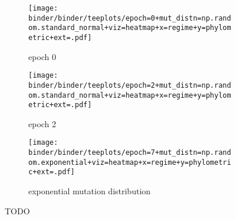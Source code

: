 \begin{figure*}
  \centering
  \begin{subfigure}[b]{\textwidth}
    \centering
    \texttt{[image: binder/binder/teeplots/epoch=0+mut\_distn=np.random.standard\_normal+viz=heatmap+x=regime+y=phylometric+ext=.pdf]}
    \caption{epoch 0}
    \label{fig:perfect-tree-phylometrics-heatmap-sensitivity-analysis:epoch0}
  \end{subfigure}
  \begin{subfigure}[b]{\textwidth}
    \centering
    \texttt{[image: binder/binder/teeplots/epoch=2+mut\_distn=np.random.standard\_normal+viz=heatmap+x=regime+y=phylometric+ext=.pdf]}
    \caption{epoch 2}
    \label{fig:perfect-tree-phylometrics-heatmap-sensitivity-analysis:epoch2}
  \end{subfigure}
  \begin{subfigure}[b]{\textwidth}
    \centering
    \texttt{[image: binder/binder/teeplots/epoch=7+mut\_distn=np.random.exponential+viz=heatmap+x=regime+y=phylometric+ext=.pdf]}
    \caption{exponential mutation distribution}
    \label{fig:perfect-tree-phylometrics-heatmap-sensitivity-analysis:exponential}
  \end{subfigure}
  \caption{TODO}
  \label{fig:perfect-tree-phylometrics-heatmap-sensitivity-analysis}
\end{figure*}
